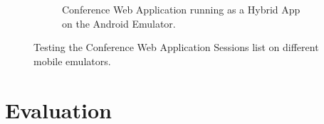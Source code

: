 \documentclass[10pt, a4paper]{article}
\begin{document}
\begin{figure}[h]
\begin{subfigure}[b]{0.4\textwidth}
\caption{Conference Web Application running as a Hybrid App on the Android
         Emulator.}
\end{subfigure}
\caption{Testing the Conference Web Application Sessions list on different
         mobile emulators.}
\label{fig:testing}
\end{figure}

\section{Evaluation}


\newpage


\end{document}
